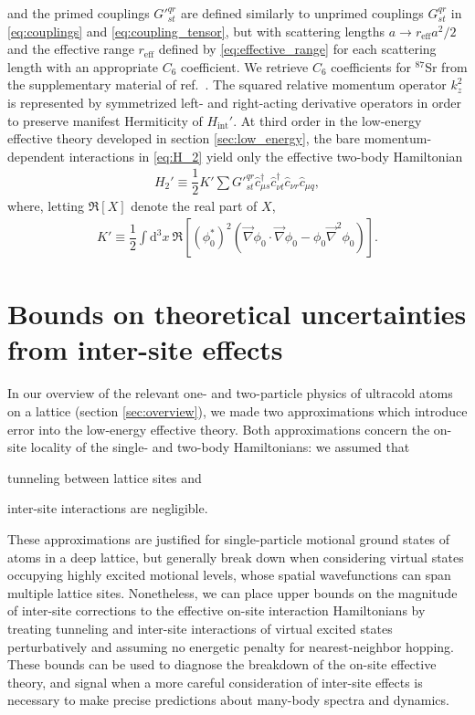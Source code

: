 \documentclass[preprint,showkeys,nofootinbib]{revtex4-1}
\renewcommand{\t}{\text} %
\newcommand{\f}{\dfrac} %
\newcommand{\p}[1]{\left(#1\right)} %
\renewcommand{\sp}[1]{\left[#1\right]} %
\renewcommand{\d}{\text{d}}
\renewcommand{\c}{\hat{c}}
\newcommand{\1}{\mathds{1}}
\begin{document}
and the primed couplings ${G'}^{qr}_{st}$ are defined similarly to
unprimed couplings $G^{qr}_{st}$ in \eqref{eq:couplings} and
\eqref{eq:coupling_tensor}, but with scattering lengths
$a\to r_{\t{eff}}a^2/2$ and the effective range $r_{\t{eff}}$ defined
by \eqref{eq:effective_range} for each scattering length with an
appropriate $C_6$ coefficient.  We retrieve $C_6$ coefficients for
${}^{87}$Sr from the supplementary material of
ref.~\cite{zhang2014spectroscopic}.  The squared relative momentum
operator $k_z^2$ is represented by symmetrized left- and right-acting
derivative operators in order to preserve manifest Hermiticity of
$H_{\t{int}}'$.  At third order in the low-energy effective theory
developed in section \ref{sec:low_energy}, the bare momentum-dependent
interactions in \eqref{eq:H_2} yield only the effective two-body
Hamiltonian
\begin{align}
  H_2' \equiv \f12 K' \sum {G'}^{qr}_{st}
  \c_{\mu s}^\dag \c_{\nu t}^\dag \c_{\nu r} \c_{\mu q},
  \label{eq:H_2_prime}
\end{align}
where, letting $\Re\sp{X}$ denote the real part of $X$,
\begin{align}
  K' \equiv \f12 \int \d^3x~
  \Re\sp{\p{\phi_0^*}^2
    \p{\vec\nabla\phi_0\cdot\vec\nabla\phi_0
      - \phi_0\vec\nabla^2\phi_0}}.
\end{align}


\section{Bounds on theoretical uncertainties from inter-site effects}
\label{sec:error}

In our overview of the relevant one- and two-particle physics of
ultracold atoms on a lattice (section \ref{sec:overview}), we made two
approximations which introduce error into the low-energy effective
theory.  Both approximations concern the on-site locality of the
single- and two-body Hamiltonians: we assumed that
\begin{enumerate*}
\item tunneling between lattice sites and
\item inter-site interactions are negligible.
\end{enumerate*}
These approximations are justified for single-particle motional ground
states of atoms in a deep lattice, but generally break down when
considering virtual states occupying highly excited motional levels,
whose spatial wavefunctions can span multiple lattice sites.
Nonetheless, we can place upper bounds on the magnitude of inter-site
corrections to the effective on-site interaction Hamiltonians by
treating tunneling and inter-site interactions of virtual excited
states perturbatively and assuming no energetic penalty for
nearest-neighbor hopping.  These bounds can be used to diagnose the
breakdown of the on-site effective theory, and signal when a more
careful consideration of inter-site effects is necessary to make
precise predictions about many-body spectra and dynamics.
\end{document}

